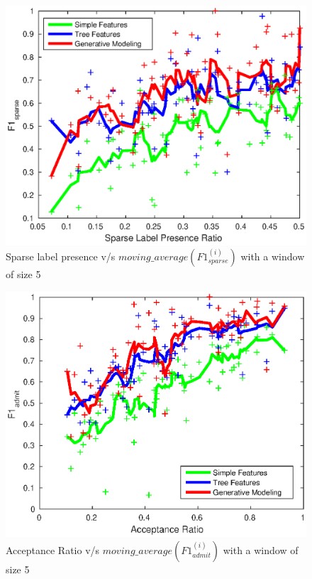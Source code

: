 \documentclass{sig-alternate-05-2015}
\begin{document}
\begin{figure}[t]
\centering
\includegraphics[scale=0.6]{sparse_label_vs_simple_tree_em.eps}
\caption{Sparse label presence v/s $moving\_average(F1^{(i)}_{sparse})$ with a window of size 5}
\label{fig:sparse_simple_tree_em}
\end{figure}

\begin{figure}[t]
\centering
\includegraphics[scale=0.6]{acceptance_ratio_vs_simple_tree_em.eps}
\caption{Acceptance Ratio v/s $moving\_average(F1^{(i)}_{admit})$ with a window of size 5}
\label{fig:acceptance_simple_tree_em}
\end{figure}
\end{document}
